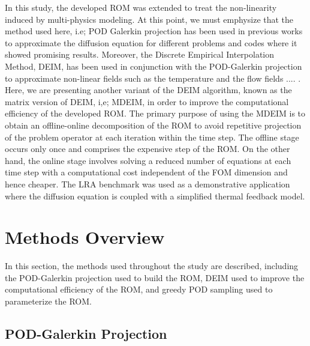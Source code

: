 \documentclass[review,number,sort&compress,12pt]{elsarticle}
\begin{document}
In this study, the developed ROM was extended to treat the non-linearity induced by multi-physics modeling.
At this point, we must emphysize that the method used here, i.e; POD Galerkin projection has been used in previous works to approximate the diffusion equation \cite{} for different problems and codes where it showed promising results.
Moreover, the  Discrete Empirical Interpolation Method, DEIM, has been used in conjunction with the POD-Galerkin projection to approximate non-linear fields such as the temperature and the flow fields  .... \cite{}.  
Here, we are presenting another variant of the DEIM algorithm, known as the matrix version of DEIM, i,e; MDEIM, in order to improve the computational efficiency of the developed ROM.
The primary purpose of using the MDEIM is to obtain an offline-online decomposition of the ROM to avoid repetitive projection of the problem operator at each iteration within the time step.
The offline stage occurs only once and comprises the expensive step of the ROM.
On the other hand, the online stage involves solving a reduced number of equations at each time step with a computational cost independent of the FOM dimension and hence cheaper.
The LRA benchmark was used as a demonstrative application where the diffusion equation is coupled with a simplified thermal feedback model.


\section{Methods Overview}

In this section, the methods used throughout the study are described, including the POD-Galerkin projection used to build the ROM, DEIM used to improve the computational efficiency of the ROM, and greedy POD sampling used to parameterize the ROM.


\subsection{POD-Galerkin Projection}
\label{sec:POD}
\end{document}

